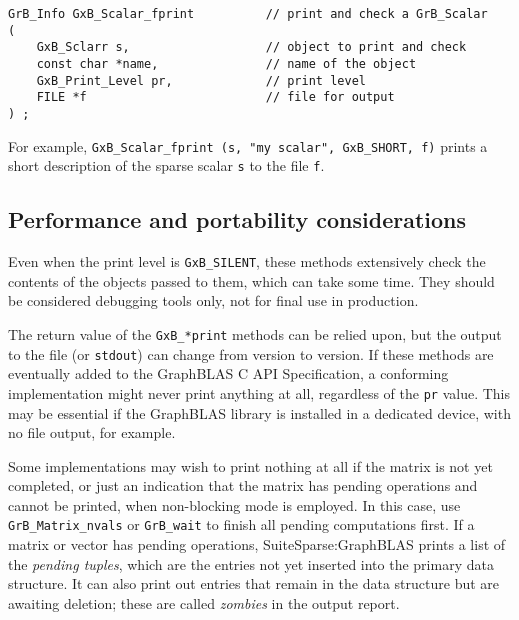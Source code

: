 \documentclass[12pt]{article}
\begin{document}
\begin{mdframed}[userdefinedwidth=6in]
{\footnotesize
\begin{verbatim}
GrB_Info GxB_Scalar_fprint          // print and check a GrB_Scalar
(
    GxB_Sclarr s,                   // object to print and check
    const char *name,               // name of the object
    GxB_Print_Level pr,             // print level
    FILE *f                         // file for output
) ;
\end{verbatim} } \end{mdframed}

For example,
\verb'GxB_Scalar_fprint (s, "my scalar", GxB_SHORT, f)'
prints a short description of the sparse scalar \verb's' to the file \verb'f'.

\newpage
\subsection{Performance and portability considerations}

Even when the print level is \verb'GxB_SILENT', these methods extensively check
the contents of the objects passed to them, which can take some time.  They
should be considered debugging tools only, not for final use in production.

The return value of the \verb'GxB_*print' methods can be relied upon, but the
output to the file (or \verb'stdout') can change from version to version.  If
these methods are eventually added to the GraphBLAS C API Specification, a
conforming implementation might never print anything at all, regardless of the
\verb'pr' value.  This may be essential if the GraphBLAS library is installed
in a dedicated device, with no file output, for example.

Some implementations may wish to print nothing at all if the matrix is not yet
completed, or just an indication that the matrix has pending operations and
cannot be printed, when non-blocking mode is employed.  In this case, use
\verb'GrB_Matrix_nvals' or \verb'GrB_wait' to finish all pending computations
first.  If a matrix or vector has pending operations, SuiteSparse:GraphBLAS
prints a list of the {\em pending tuples}, which are the entries not yet
inserted into the primary data structure.  It can also print out entries that
remain in the data structure but are awaiting deletion; these are called {\em
zombies} in the output report.
\end{document}
